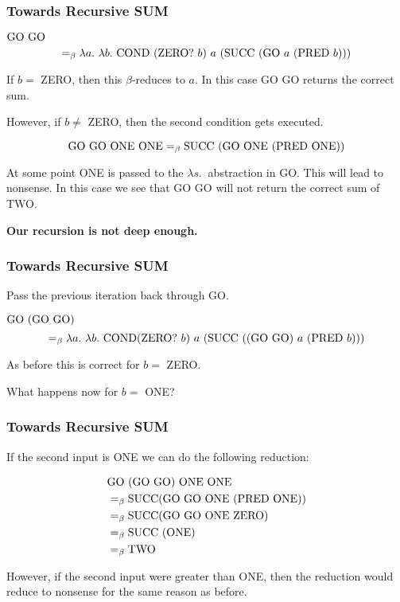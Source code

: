 \documentclass{beamer}
\begin{document}
\begin{frame}
	\frametitle{Towards Recursive SUM}

	$\text{GO} \ \text{GO} $
	$$=_{\beta} \lambda a. \ \lambda b. \ \text{COND} \ (\text{ZERO?} \ b) \ a \ (\text{SUCC} \ (\text{GO} \ a \ (\text{PRED} \ b))) $$

	If $b =$ ZERO, then this $\beta$-reduces to $a$.
	In this case GO GO returns the correct sum. 

	\vspace{0.2cm}
	
	However, if $b \neq $ ZERO, then the second condition gets executed. 

	$$\text{GO} \ \text{GO} \ \text{ONE} \ \text{ONE} =_{\beta} \text{SUCC} \ (\text{GO} \ \text{ONE} \ (\text{PRED} \ \text{ONE}))$$

	At some point ONE is passed to the $\lambda s. \ $ abstraction in GO. This will lead to nonsense. In this case we see that GO GO will not return the correct sum of TWO.

	\vspace{0.5cm}

	{\bf Our recursion is not deep enough.}
\end{frame}

\begin{frame}
	\frametitle{Towards Recursive SUM}

	Pass the previous iteration back through GO. 

	$ \text{GO} \ (\text{GO} \ \text{GO})$
	$$=_{\beta} \lambda a. \ \lambda b. \ \text{COND} (\text{ZERO?} \ b) \ a \ (\text{SUCC} \ ((\text{GO} \ \text{GO}) \ a \ (\text{PRED} \ b))) $$

	As before this is correct for $b = $ ZERO. 
	
	What happens now for $b = $ ONE?

\end{frame}

\begin{frame}
	\frametitle{Towards Recursive SUM}

	If the second input is ONE we can do the following reduction:

	\begin{align*}
		&\text{GO} \ (\text{GO} \ \text{GO}) \ \text{ONE} \ \text{ONE} \\
		&=_{\beta} \text{SUCC} (\text{GO} \ \text{GO} \ \text{ONE} \ (\text{PRED} \ \text{ONE})) \\
		&=_{\beta} \text{SUCC} (\text{GO} \ \text{GO} \ \text{ONE} \ \text{ZERO}) \\
		&=_{\beta} \text{SUCC} \ (\text{ONE}) \\
		&=_{\beta} \text{TWO}
	\end{align*}

	However, if the second input were greater than ONE, then the reduction would reduce to nonsense for the same reason as before.
\end{frame}
\end{document}
